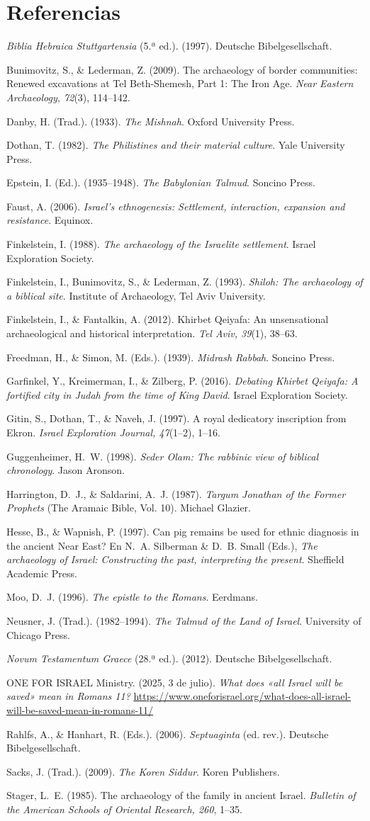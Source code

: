 \documentclass[11pt,letterpaper]{article}
\newcommand{\refapa}[1]{\par{\RaggedRight\hangindent=1.27cm\hangafter=1\noindent #1\par}\vspace{4pt}}
\begin{document}
\section*{Referencias}
\refapa{\emph{Biblia Hebraica Stuttgartensia} (5.ª ed.). (1997). Deutsche Bibelgesellschaft.}
\refapa{Bunimovitz, S., \& Lederman, Z. (2009). The archaeology of border communities: Renewed excavations at Tel Beth-Shemesh, Part 1: The Iron Age. \emph{Near Eastern Archaeology, 72}(3), 114--142.}
\refapa{Danby, H. (Trad.). (1933). \emph{The Mishnah}. Oxford University Press.}
\refapa{Dothan, T. (1982). \emph{The Philistines and their material culture}. Yale University Press.}
\refapa{Epstein, I. (Ed.). (1935--1948). \emph{The Babylonian Talmud}. Soncino Press.}
\refapa{Faust, A. (2006). \emph{Israel's ethnogenesis: Settlement, interaction, expansion and resistance}. Equinox.}
\refapa{Finkelstein, I. (1988). \emph{The archaeology of the Israelite settlement}. Israel Exploration Society.}
\refapa{Finkelstein, I., Bunimovitz, S., \& Lederman, Z. (1993). \emph{Shiloh: The archaeology of a biblical site}. Institute of Archaeology, Tel Aviv University.}
\refapa{Finkelstein, I., \& Fantalkin, A. (2012). Khirbet Qeiyafa: An unsensational archaeological and historical interpretation. \emph{Tel Aviv, 39}(1), 38--63.}
\refapa{Freedman, H., \& Simon, M. (Eds.). (1939). \emph{Midrash Rabbah}. Soncino Press.}
\refapa{Garfinkel, Y., Kreimerman, I., \& Zilberg, P. (2016). \emph{Debating Khirbet Qeiyafa: A fortified city in Judah from the time of King David}. Israel Exploration Society.}
\refapa{Gitin, S., Dothan, T., \& Naveh, J. (1997). A royal dedicatory inscription from Ekron. \emph{Israel Exploration Journal, 47}(1--2), 1--16.}
\refapa{Guggenheimer, H.~W. (1998). \emph{Seder Olam: The rabbinic view of biblical chronology}. Jason Aronson.}
\refapa{Harrington, D.~J., \& Saldarini, A.~J. (1987). \emph{Targum Jonathan of the Former Prophets} (The Aramaic Bible, Vol. 10). Michael Glazier.}
\refapa{Hesse, B., \& Wapnish, P. (1997). Can pig remains be used for ethnic diagnosis in the ancient Near East? En N.~A. Silberman \& D.~B. Small (Eds.), \emph{The archaeology of Israel: Constructing the past, interpreting the present}. Sheffield Academic Press.}
\refapa{Moo, D.~J. (1996). \emph{The epistle to the Romans}. Eerdmans.}
\refapa{Neusner, J. (Trad.). (1982--1994). \emph{The Talmud of the Land of Israel}. University of Chicago Press.}
\refapa{\emph{Novum Testamentum Graece} (28.ª ed.). (2012). Deutsche Bibelgesellschaft.}
\refapa{ONE FOR ISRAEL Ministry. (2025, 3 de julio). \emph{What does «all Israel will be saved» mean in Romans 11?} \url{https://www.oneforisrael.org/what-does-all-israel-will-be-saved-mean-in-romans-11/}}
\refapa{Rahlfs, A., \& Hanhart, R. (Eds.). (2006). \emph{Septuaginta} (ed. rev.). Deutsche Bibelgesellschaft.}
\refapa{Sacks, J. (Trad.). (2009). \emph{The Koren Siddur}. Koren Publishers.}
\refapa{Stager, L.~E. (1985). The archaeology of the family in ancient Israel. \emph{Bulletin of the American Schools of Oriental Research, 260}, 1--35.}
\end{document}
